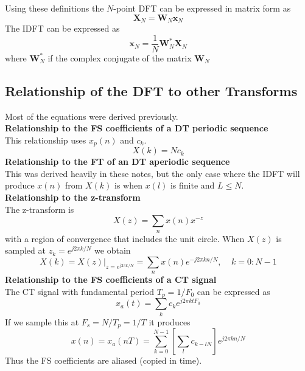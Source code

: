 \documentclass{article} %
\begin{document}
	Using these definitions the $N$-point DFT can be expressed in matrix form as\
	\begin{equation}
	\textbf{X}_N = \textbf{W}_N \textbf{x}_N
	\end{equation}
	The IDFT can be expressed as 
	\begin{equation}
	\textbf{x}_N = \frac{1}{N}\textbf{W}_N^* \textbf{X}_N
	\end{equation}
	where $\textbf{W}_N^*$ if the complex conjugate of the matrix $\textbf{W}_N$
	
	\subsection{Relationship of the DFT to other Transforms}
	Most of the equations were derived previously.\\
	\textbf{Relationship to the FS coefficients of a DT periodic sequence}\\
	This relationship uses $x_p(n)$ and $c_k$.
	\begin{equation}
	X(k) = Nc_k
	\end{equation}
	\textbf{Relationship to the FT of an DT aperiodic sequence}\\
	This was derived heavily in these notes, but the only case where the IDFT will produce $x(n)$ from $X(k)$ is when $x(l)$ is finite and $L \le N$.\\
	\textbf{Relationship to the z-transform}\\
	The z-transform is
	\begin{equation}
	X(z) = \sum_n x(n)x^{-z}
	\end{equation}
	with a region of convergence that includes the unit circle. When $X(z)$ is sampled at $z_k = e^{j2\pi k/N}$ we obtain
	\begin{equation}
	X(k) = X(z)|_{z=e^{j2\pi k/N}} = \sum_n x(n)e^{-j2\pi kn/N}, \;\;\;\; k = 0:N-1
	\end{equation}
	\textbf{Relationship to the FS coefficients of a CT signal}\\
	The CT signal with fundamental period $T_p = 1/F_0$ can be expressed as 
	\begin{equation}
	x_a(t) = \sum_k c_ke^{j2\pi ktF_0}
	\end{equation}
	If we sample this at $F_s = N/T_p = 1/T$ it produces
	\begin{equation}
	x(n) = x_a(nT) = \sum_{k=0}^{N-1} [ \sum_l c_{k-lN}]e^{j2\pi kn/N}
	\end{equation}
	Thus the FS coefficients are aliased (copied in time).\\
	
\end{document}
